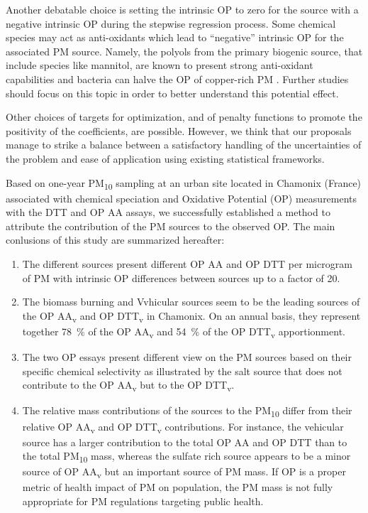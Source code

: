 \documentclass[acp, manuscript]{copernicus}
\begin{document}
Another debatable choice is setting the intrinsic OP to zero for the source with
a negative intrinsic OP during the stepwise regression process. Some chemical
species may act as anti-oxidants which lead to ``negative'' intrinsic OP for the
associated PM source. Namely, the polyols from the primary biogenic source, that
include species like mannitol, are known to present strong anti-oxidant
capabilities \citep{liu_therapeutic_2010} and bacteria can halve the OP of
copper-rich PM \citep{samake_unexpected_2017}. Further studies should focus on
this topic in order to better understand this potential effect.

Other choices of targets for optimization, and of penalty functions to promote
the positivity of the coefficients, are possible. However, we think that our
proposals manage to strike a balance between a satisfactory handling of the
uncertainties of the problem and ease of application using existing statistical
frameworks.


\conclusions  %

Based on one-year PM\textsubscript{10} sampling at an urban site located in
Chamonix (France) associated with chemical speciation and Oxidative Potential
(OP) measurements with the DTT and OP AA assays, we successfully established a
method to attribute the contribution of the PM sources to the observed OP.
The main conlusions of this study are summarized hereafter:
\begin{enumerate}
    \item
        The different sources present different OP AA and OP DTT per microgram of PM
        with intrinsic OP differences between sources up to a factor of 20.
    \item
        The biomass burning and Vvhicular sources seem to be the leading sources of
        the OP AA\textsubscript{v} and OP DTT\textsubscript{v} in Chamonix. On an
        annual basis, they represent together 78~\% of the OP AA\textsubscript{v} and
        54~\% of the OP DTT\textsubscript{v} apportionment.
    \item
        The two OP essays present different view on the PM sources based on their
        specific chemical selectivity as illustrated by the salt source that does not
        contribute to the OP AA\textsubscript{v} but to the OP DTT\textsubscript{v}.
    \item
        The relative mass contributions of the sources to the PM\textsubscript{10}
        differ from their relative OP AA\textsubscript{v} and OP DTT\textsubscript{v}
        contributions. For instance, the vehicular source has a larger contribution to
        the total OP AA and OP DTT than to the total PM\textsubscript{10} mass,
        whereas the sulfate rich source appears to be a minor source of OP
        AA\textsubscript{v} but an important source of PM mass. If OP is a proper
        metric of health impact of PM on population, the PM mass is not fully
        appropriate for PM regulations targeting public health.
\end{enumerate}
\end{document}
